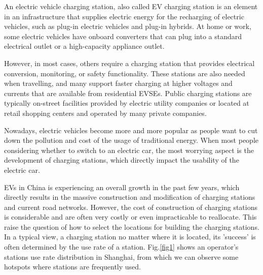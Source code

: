 An electric vehicle charging station, also called EV charging station is an element in an infrastructure that supplies electric energy for the recharging of electric vehicles, such as plug-in electric vehicles and plug-in hybrids. At home or work, some electric vehicles have onboard converters that can plug into a standard electrical outlet or a high-capacity appliance outlet. 

However, in most cases, others require a charging station that provides electrical conversion, monitoring, or safety functionality. These stations are also needed when travelling, and many support faster charging at higher voltages and currents that are available from residential EVSEs. Public charging stations are typically on-street facilities provided by electric utility companies or located at retail shopping centers and operated by many private companies.

Nowadays, electric vehicles become more and more popular as people want to cut down the pollution and cost of the usage of traditional energy. When most people considering whether to switch to an electric car, the most worrying aspect is the development of charging stations, which directly impact the usability of the electric car.

EVs in China is experiencing an overall growth in the past few years, which directly results in the massive construction and modification of charging stations and current road networks.  However, the cost of construction of charging stations is considerable and are often very costly or even impracticable to reallocate. This raise the question of how to select the locations for building the charging stations. In a typical view, a charging station no matter where it is located, its 'success' is often determined by the use rate of a station. Fig.\ref{fig1} shows an operator's stations use rate distribution in Shanghai, from which we can observe some hotspots where stations are frequently used.

